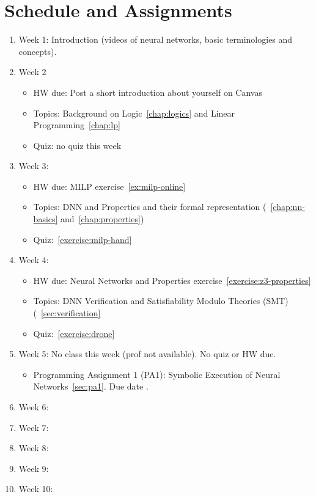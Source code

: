 \documentclass[oneside,11pt,dvipsnames]{book}
\numberwithin{equation}{section}
\theoremstyle{definition}
\theoremstyle{remark}
\newcommand{\alert}[1]{{\color{red}{#1}}}
\begin{document}
\chapter{Schedule and Assignments}
\begin{enumerate}
    \item Week 1: Introduction (videos of neural networks, basic terminologies and concepts).
    \item Week 2
    \begin{itemize}
    \item HW due: Post a short introduction about yourself on Canvas
    \item Topics: Background on Logic~\autoref{chap:logics} and Linear Programming~\autoref{chap:lp}
    \item Quiz: no quiz this week
    \end{itemize}
    \item Week 3:
    \begin{itemize}
        \item HW due: MILP exercise~\autoref{ex:milp-online}
        \item Topics: DNN and Properties and their formal representation (~\autoref{chap:nn-basics} and~\autoref{chap:properties})
        \item Quiz:~\autoref{exercise:milp-hand}
    \end{itemize}
    \item Week 4:
    \begin{itemize}
        \item HW due: Neural Networks and Properties exercise~\autoref{exercise:z3-properties}
        \item Topics: DNN Verification and Satisfiability Modulo Theories (SMT) (~\autoref{sec:verification} 
        \item Quiz:~\autoref{exercise:drone}
    \end{itemize}
    \item Week 5: No class this week (prof not available). No quiz or HW due. 
    \begin{itemize}
        \item Programming Assignment 1 (PA1): Symbolic Execution of Neural Networks~\autoref{sec:pa1}. Due date \alert{Monday October 6, 2024 11:59pm}.
    \end{itemize}
    \item Week 6:
    \item Week 7:
    \item Week 8:
    \item Week 9:
    \item Week 10:
\end{enumerate}    
\end{document}
